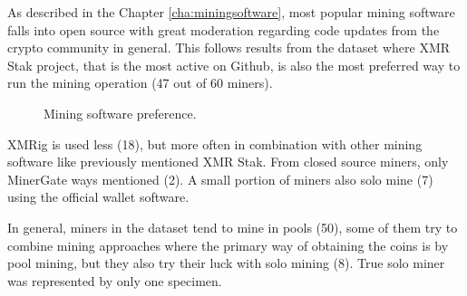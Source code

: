 \documentclass[
  printed, %
  table,   %
  lof,     %
  lot,     %
           oneside, color
]{fithesis3}
\begin{document}
As described in the Chapter \ref{cha:miningsoftware}, most popular mining software falls into open source with great moderation regarding code updates from the crypto community in general. This follows results from the dataset where XMR Stak project, that is the most active on Github, is also the most preferred way to run the mining operation (47 out of 60 miners).
\vspace{-1.3em}
\begin{center}
\begin{figure}[H]
\caption{Mining software preference.}
\label{chart:mininghabbits}\end{figure}\end{center}
XMRig is used less (18), but more often in combination with other mining software like previously mentioned XMR Stak. From closed source miners, only MinerGate ways mentioned (2). A small portion of miners also solo mine (7) using the official wallet software. 
 
In general, miners in the dataset tend to mine in pools (50), some of them try to combine mining approaches where the primary way of obtaining the coins is by pool mining, but they also try their luck with solo mining (8). True solo miner was represented by only one specimen. 
\end{document}
